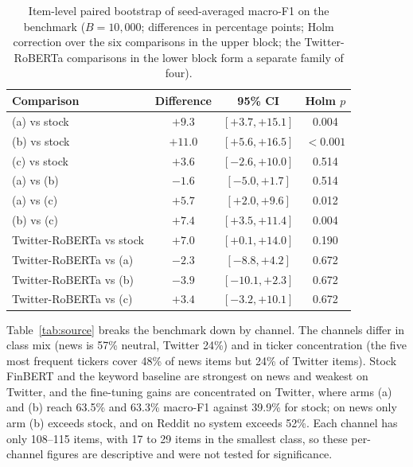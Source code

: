 \documentclass{aims}
\numberwithin{equation}{section}
\begin{document}
\begin{table}[ht]
\centering
\caption{Item-level paired bootstrap of seed-averaged macro-F1 on the benchmark
($B = 10{,}000$; differences in percentage points; Holm correction over the six
comparisons in the upper block; the Twitter-RoBERTa comparisons in the lower block
form a separate family of four).}
\label{tab:boot}
\begin{tabular}{lccc}
\toprule
\textbf{Comparison} & \textbf{Difference} & \textbf{95\% CI} & \textbf{Holm $p$} \\
\midrule
(a) vs stock & $+9.3$ & $[+3.7, +15.1]$ & 0.004 \\
(b) vs stock & $+11.0$ & $[+5.6, +16.5]$ & $<0.001$ \\
(c) vs stock & $+3.6$ & $[-2.6, +10.0]$ & 0.514 \\
(a) vs (b) & $-1.6$ & $[-5.0, +1.7]$ & 0.514 \\
(a) vs (c) & $+5.7$ & $[+2.0, +9.6]$ & 0.012 \\
(b) vs (c) & $+7.4$ & $[+3.5, +11.4]$ & 0.004 \\
\midrule
Twitter-RoBERTa vs stock & $+7.0$ & $[+0.1, +14.0]$ & 0.190 \\
Twitter-RoBERTa vs (a) & $-2.3$ & $[-8.8, +4.2]$ & 0.672 \\
Twitter-RoBERTa vs (b) & $-3.9$ & $[-10.1, +2.3]$ & 0.672 \\
Twitter-RoBERTa vs (c) & $+3.4$ & $[-3.2, +10.1]$ & 0.672 \\
\bottomrule
\end{tabular}
\end{table}

Table~\ref{tab:source} breaks the benchmark down by channel. The channels differ
in class mix (news is 57\% neutral, Twitter 24\%) and in ticker concentration (the
five most frequent tickers cover 48\% of news items but 24\% of Twitter items).
Stock FinBERT and the keyword baseline are strongest on news and weakest on Twitter,
and the fine-tuning gains are concentrated on Twitter, where arms (a) and (b) reach
63.5\% and 63.3\% macro-F1 against 39.9\% for stock; on news only arm (b) exceeds
stock, and on Reddit no system exceeds 52\%. Each channel has only 108--115 items,
with 17 to 29 items in the smallest class, so these per-channel figures are
descriptive and were not tested for significance.
\end{document}
